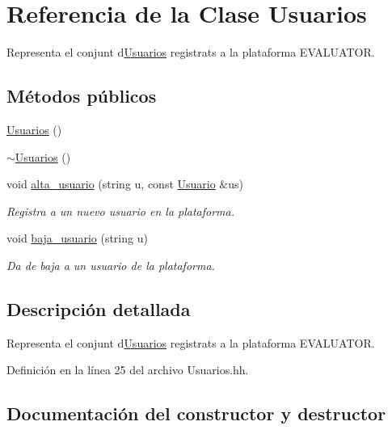 \hypertarget{class_usuarios}{}\section{Referencia de la Clase Usuarios}
\label{class_usuarios}


Representa el conjunt d\textquotesingle{}\mbox{\hyperlink{class_usuarios}{Usuarios}} registrats a la plataforma E\+V\+A\+L\+U\+A\+T\+OR.  


\subsection*{Métodos públicos}
\begin{DoxyCompactItemize}
\item 
\mbox{\hyperlink{class_usuarios_a90a1868e60e0914555701ae554aa9e87}{Usuarios}} ()
\item 
\mbox{\hyperlink{class_usuarios_a6ca03accac71e8267f98558b18f8b78e}{$\sim$\+Usuarios}} ()
\item 
void \mbox{\hyperlink{class_usuarios_aae1a0ac8740e6396a6325d56043060f8}{alta\+\_\+usuario}} (string u, const \mbox{\hyperlink{class_usuario}{Usuario}} \&us)
\begin{DoxyCompactList}\small\item\em Registra a un nuevo usuario en la plataforma. \end{DoxyCompactList}\item 
void \mbox{\hyperlink{class_usuarios_a11e75ce29066b53e84731315ef476312}{baja\+\_\+usuario}} (string u)
\begin{DoxyCompactList}\small\item\em Da de baja a un usuario de la plataforma. \end{DoxyCompactList}\end{DoxyCompactItemize}


\subsection{Descripción detallada}
Representa el conjunt d\textquotesingle{}\mbox{\hyperlink{class_usuarios}{Usuarios}} registrats a la plataforma E\+V\+A\+L\+U\+A\+T\+OR. 

Definición en la línea 25 del archivo Usuarios.\+hh.



\subsection{Documentación del constructor y destructor}
\mbox{\label{class_usuarios_a90a1868e60e0914555701ae554aa9e87}} 
